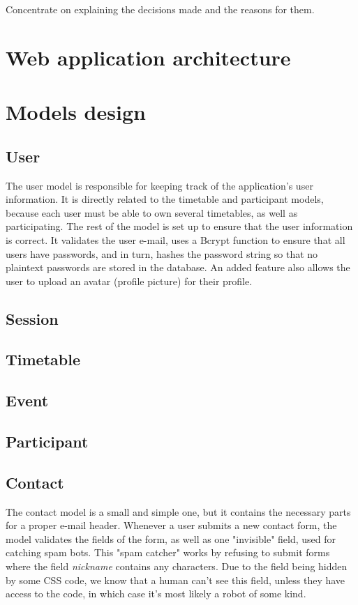 Concentrate on explaining the decisions made and the reasons for them.
\section{Web application architecture}

\section{Models design}
\subsection{User}
The user model is responsible for keeping track of the application's user information. It is directly related to the timetable and participant models, because each user must be able to own several timetables, as well as participating. The rest of the model is set up to ensure that the user information is correct. It validates the user e-mail, uses a Bcrypt function to ensure that all users have passwords, and in turn, hashes the password string so that no plaintext passwords are stored in the database. An added feature also allows the user to upload an avatar (profile picture) for their profile. 

\subsection{Session}
\subsection{Timetable}
\subsection{Event}
\subsection{Participant}
\subsection{Contact}
The contact model is a small and simple one, but it contains the necessary parts for a proper e-mail header. Whenever a user submits a new contact form, the model validates the fields of the form, as well as one "invisible" field, used for catching spam bots. This "spam catcher" works by refusing to submit forms where the field \textit{nickname} contains any characters. Due to the field being hidden by some CSS code, we know that a human can't see this field, unless they have access to the code, in which case it's most likely a robot of some kind.
 

